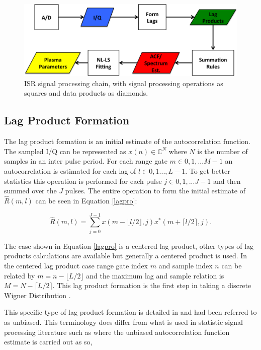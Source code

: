 \documentclass[draft,ras]{agutex}
\begin{document}
\begin{article}
\begin{figure}[!t]
\centering
\includegraphics[width=6in]{datastackchain}
\caption{ISR signal processing chain, with signal processing operations as squares and data products as diamonds.}
\label{fig:chain}
\end{figure}



\subsection{Lag Product Formation}
The lag product formation is an initial estimate of the autocorrelation function. The sampled I/Q can be represented as $x(n) \in\mathbb{C}^N$ where $N$ is the number of samples in an inter pulse period. For each range gate $m\in 0,1,...M-1$ an autocorrelation is estimated for each lag of $l \in 0,1...,L-1$.  To get better statistics this operation is performed for each pulse $j\in 0,1,...J-1$ and then summed over the $J$ pulses. The entire operation to form the initial estimate of $\hat{R}(m,l)$ can be seen in Equation \ref{lagpro}:

\begin{equation}
\label{lagpro}
\hat{R}(m,l) = \displaystyle\sum\limits_{j=0}^{J-1} x(m-\lfloor l/2\rfloor,j)x^*(m+\lceil l/2 \rceil,j).
\end{equation}

The case shown in Equation \ref{lagpro} is a centered lag product, other types of lag products calculations are available but generally a centered product is used. In the centered lag product case range gate index $m$ and sample index $n$ can be related by $m=n-\lfloor L/2\rfloor$ and the maximum lag and sample relation is $M=N-\lceil L/2 \rceil$.  This lag product formation is the first step in taking a discrete Wigner Distribution \citep{TFAcohen}.

This specific type of lag product formation is detailed in \citep{farley1969} and had been referred to as unbiased. This terminology does differ from what is used in statistic signal processing literature such as \citep{randomsigshanmugan} where the unbiased autocorrelation function estimate is carried out as so,


\end{article}
\end{document}

